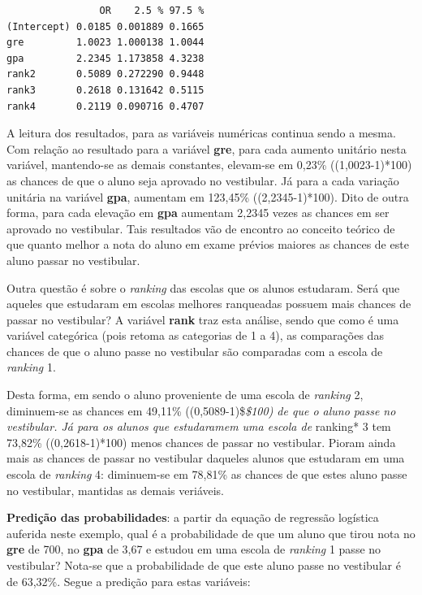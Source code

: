 \documentclass[12pt,brazil,oneside]{book}
\newenvironment{Shaded}{\begin{snugshade}}{\end{snugshade}}
\newcommand{\DataTypeTok}[1]{\textcolor[rgb]{0.13,0.29,0.53}{#1}}
\newcommand{\DecValTok}[1]{\textcolor[rgb]{0.00,0.00,0.81}{#1}}
\newcommand{\FloatTok}[1]{\textcolor[rgb]{0.00,0.00,0.81}{#1}}
\newcommand{\KeywordTok}[1]{\textcolor[rgb]{0.13,0.29,0.53}{\textbf{#1}}}
\newcommand{\NormalTok}[1]{#1}
\newcommand{\OperatorTok}[1]{\textcolor[rgb]{0.81,0.36,0.00}{\textbf{#1}}}
\newcommand{\StringTok}[1]{\textcolor[rgb]{0.31,0.60,0.02}{#1}}
\begin{document}
\begin{verbatim}
                OR    2.5 % 97.5 %
(Intercept) 0.0185 0.001889 0.1665
gre         1.0023 1.000138 1.0044
gpa         2.2345 1.173858 4.3238
rank2       0.5089 0.272290 0.9448
rank3       0.2618 0.131642 0.5115
rank4       0.2119 0.090716 0.4707
\end{verbatim}

A leitura dos resultados, para as variáveis numéricas continua sendo a mesma. Com relação ao resultado para a variável \textbf{gre}, para cada aumento unitário nesta variável, mantendo-se as demais constantes, elevam-se em 0,23\% ((1,0023-1)*100) as chances de que o aluno seja aprovado no vestibular. Já para a cada variação unitária na variável \textbf{gpa}, aumentam em 123,45\% ((2,2345-1)*100).
Dito de outra forma, para cada elevação em \textbf{gpa} aumentam 2,2345 vezes as chances em ser aprovado no vestibular. Tais resultados vão de encontro ao conceito teórico de que quanto melhor a nota do aluno em exame prévios maiores as chances de este aluno passar no vestibular.

Outra questão é sobre o \emph{ranking} das escolas que os alunos estudaram. Será que aqueles que estudaram em escolas melhores ranqueadas possuem mais chances de passar no vestibular? A variável \textbf{rank} traz esta análise, sendo que como é uma variável categórica (pois retoma as categorias de 1 a 4), as comparações das chances de que o aluno passe no vestibular são comparadas com a escola de \emph{ranking} 1.

Desta forma, em sendo o aluno proveniente de uma escola de \emph{ranking} 2, diminuem-se as chances em 49,11\% ((0,5089-1)\$\emph{\$100) de que o aluno passe no vestibular. Já para os alunos que estudaramem uma escola de }ranking* 3 tem 73,82\% ((0,2618-1)*100) menos chances de passar no vestibular.
Pioram ainda mais as chances de passar no vestibular daqueles alunos que estudaram em uma escola de \emph{ranking} 4: diminuem-se em 78,81\% as chances de que estes aluno passe no vestibular, mantidas as demais veriáveis.

\textbf{Predição das probabilidades}: a partir da equação de regressão logística auferida neste exemplo, qual é a probabilidade de que um aluno que tirou nota no \textbf{gre} de 700, no \textbf{gpa} de 3,67 e estudou em uma escola de \emph{ranking} 1 passe no vestibular?
Nota-se que a probabilidade de que este aluno passe no vestibular é de 63,32\%. Segue a predição para estas variáveis:

\begin{Shaded}
\end{Shaded}
\end{document}
